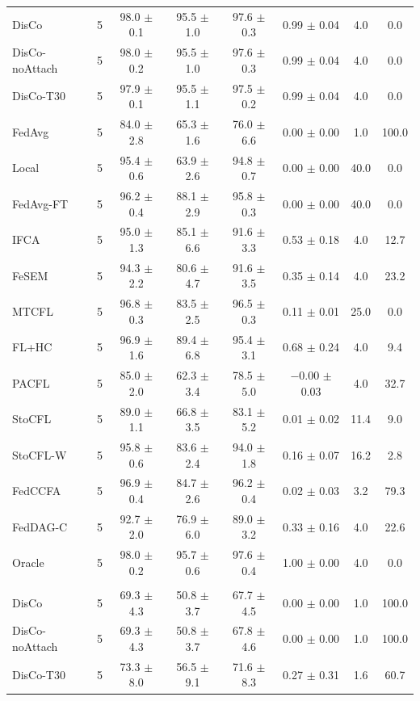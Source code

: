 {\begin{tabular}{l r c c c c c c}
DisCo & 5 & 98.0 $\pm$ 0.1 & 95.5 $\pm$ 1.0 & 97.6 $\pm$ 0.3 & 0.99 $\pm$ 0.04 & 4.0 & 0.0 \\
DisCo-noAttach & 5 & 98.0 $\pm$ 0.2 & 95.5 $\pm$ 1.0 & 97.6 $\pm$ 0.3 & 0.99 $\pm$ 0.04 & 4.0 & 0.0 \\
DisCo-T30 & 5 & 97.9 $\pm$ 0.1 & 95.5 $\pm$ 1.1 & 97.5 $\pm$ 0.2 & 0.99 $\pm$ 0.04 & 4.0 & 0.0 \\
FedAvg & 5 & 84.0 $\pm$ 2.8 & 65.3 $\pm$ 1.6 & 76.0 $\pm$ 6.6 & 0.00 $\pm$ 0.00 & 1.0 & 100.0 \\
Local & 5 & 95.4 $\pm$ 0.6 & 63.9 $\pm$ 2.6 & 94.8 $\pm$ 0.7 & 0.00 $\pm$ 0.00 & 40.0 & 0.0 \\
FedAvg-FT & 5 & 96.2 $\pm$ 0.4 & 88.1 $\pm$ 2.9 & 95.8 $\pm$ 0.3 & 0.00 $\pm$ 0.00 & 40.0 & 0.0 \\
IFCA & 5 & 95.0 $\pm$ 1.3 & 85.1 $\pm$ 6.6 & 91.6 $\pm$ 3.3 & 0.53 $\pm$ 0.18 & 4.0 & 12.7 \\
FeSEM & 5 & 94.3 $\pm$ 2.2 & 80.6 $\pm$ 4.7 & 91.6 $\pm$ 3.5 & 0.35 $\pm$ 0.14 & 4.0 & 23.2 \\
MTCFL & 5 & 96.8 $\pm$ 0.3 & 83.5 $\pm$ 2.5 & 96.5 $\pm$ 0.3 & 0.11 $\pm$ 0.01 & 25.0 & 0.0 \\
FL+HC & 5 & 96.9 $\pm$ 1.6 & 89.4 $\pm$ 6.8 & 95.4 $\pm$ 3.1 & 0.68 $\pm$ 0.24 & 4.0 & 9.4 \\
PACFL & 5 & 85.0 $\pm$ 2.0 & 62.3 $\pm$ 3.4 & 78.5 $\pm$ 5.0 & $-$0.00 $\pm$ 0.03 & 4.0 & 32.7 \\
StoCFL & 5 & 89.0 $\pm$ 1.1 & 66.8 $\pm$ 3.5 & 83.1 $\pm$ 5.2 & 0.01 $\pm$ 0.02 & 11.4 & 9.0 \\
StoCFL-W & 5 & 95.8 $\pm$ 0.6 & 83.6 $\pm$ 2.4 & 94.0 $\pm$ 1.8 & 0.16 $\pm$ 0.07 & 16.2 & 2.8 \\
FedCCFA & 5 & 96.9 $\pm$ 0.4 & 84.7 $\pm$ 2.6 & 96.2 $\pm$ 0.4 & 0.02 $\pm$ 0.03 & 3.2 & 79.3 \\
FedDAG-C & 5 & 92.7 $\pm$ 2.0 & 76.9 $\pm$ 6.0 & 89.0 $\pm$ 3.2 & 0.33 $\pm$ 0.16 & 4.0 & 22.6 \\
Oracle & 5 & 98.0 $\pm$ 0.2 & 95.7 $\pm$ 0.6 & 97.6 $\pm$ 0.4 & 1.00 $\pm$ 0.00 & 4.0 & 0.0 \\
\addlinespace
\multicolumn{8}{l}{\textit{SVHN rotation}} \\
DisCo & 5 & 69.3 $\pm$ 4.3 & 50.8 $\pm$ 3.7 & 67.7 $\pm$ 4.5 & 0.00 $\pm$ 0.00 & 1.0 & 100.0 \\
DisCo-noAttach & 5 & 69.3 $\pm$ 4.3 & 50.8 $\pm$ 3.7 & 67.8 $\pm$ 4.6 & 0.00 $\pm$ 0.00 & 1.0 & 100.0 \\
DisCo-T30 & 5 & 73.3 $\pm$ 8.0 & 56.5 $\pm$ 9.1 & 71.6 $\pm$ 8.3 & 0.27 $\pm$ 0.31 & 1.6 & 60.7 \\

\end{tabular}}
